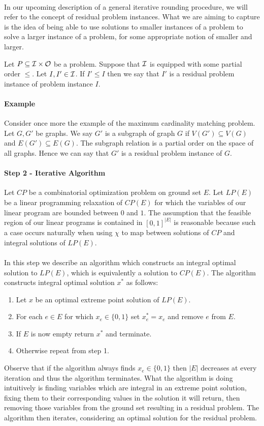 \paragraph{}
In our upcoming description of a general iterative rounding procedure, we will refer to the concept of residual problem instances. What we are aiming to capture is the idea of being able to use solutions to smaller instances of a problem to solve a larger instance of a problem, for some appropriate notion of smaller and larger.
\begin{definition}
Let $P \subseteq \mathcal{I} \times \mathcal{O}$ be a problem. Suppose that $\mathcal{I}$ is equipped with some partial order $\leq$. Let $I, I' \in \mathcal{I}$. If $I' \leq I$ then we say that $I'$ is a residual problem instance of problem instance $I$.
\end{definition}
\paragraph{Example}
Consider once more the example of the maximum cardinality matching problem. Let $G, G'$ be graphs. We say $G'$ is a subgraph of graph $G$ if $V(G') \subseteq V(G)$ and $E(G') \subseteq E(G)$. The subgraph relation is a partial order on the space of all graphs. Hence we can say that $G'$ is a residual problem instance of $G$.
\paragraph{Step 2 - Iterative Algorithm}
Let $CP$ be a combinatorial optimization problem on ground set $E$. Let $LP(E)$ be a linear programming relaxation of $CP(E)$ for which the variables of our linear program are bounded between $0$ and $1$. The assumption that the feasible region of our linear programs is contained in $[0,1]^{|E|}$ is reasonable because such a case occurs naturally when using $\chi$ to map between solutions of $CP$ and integral solutions of $LP(E)$. 
\paragraph{}
In this step we describe an algorithm which constructs an integral optimal solution to $LP(E)$, which is equivalently a solution to $CP(E)$. The algorithm constructs integral optimal solution $x^*$ as follows:
\begin{enumerate}
\item Let $x$ be an optimal extreme point solution of $LP(E)$.
\item For each $e \in E$ for which $x_e  \in \{0,1\}$ set $x^*_e = x_e$ and remove $e$ from $E$.
\item If $E$ is now empty return $x^*$ and terminate.
\item Otherwise repeat from step 1.
\end{enumerate}
Observe that if the algorithm always finds $x_e \in \{0,1\}$ then $|E|$ decreases at every iteration and thus the algorithm terminates. What the algorithm is doing intuitively is finding variables which are integral in an extreme point solution, fixing them to their corresponding values in the solution it will return, then removing those variables from the ground set resulting in a residual problem. The algorithm then iterates, considering an optimal solution for the residual problem. 
